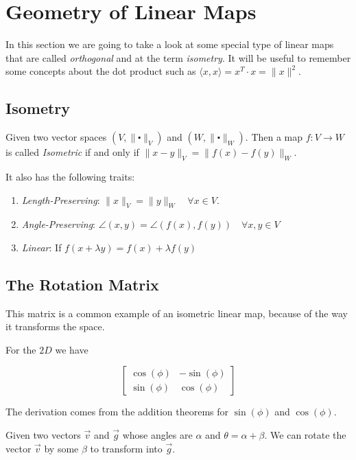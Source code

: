 \newpage
\section{Geometry of Linear Maps}

In this section we are going to take a look at some special type of linear maps that are called \emph{orthogonal} 
and at the term \emph{isometry}. It will be useful to remember some concepts about the dot product such as 
\(\langle x, x \rangle = x^T \cdot x = \|x\|^2\).

\subsection{Isometry}

Given two vector spaces \((V, \|\centerdot\|_V)\) and \((W, \|\centerdot\|_W)\). Then a map 
\(f: V \to W\) is called \emph{Isometric} if and only if \(\|x - y\|_V = \|f(x) - f(y)\|_W \).

It also has the following traits:

\begin{enumerate}
	\item \emph{Length-Preserving}: \(\|x\|_V = \|y\|_W \quad \forall x \in V\).
	\item \emph{Angle-Preserving}: \(\angle (x,y) = \angle (f(x),f(y)) \quad \forall x,y \in V\)
	\item \emph{Linear}: If \(f(x + \lambda y) = f(x) + \lambda f(y)\)
\end{enumerate}

\subsection{The Rotation Matrix}

This matrix is a common example of an isometric linear map, because of the way it transforms the space.

For the \(2D\) we have 

\[
    \begin{bmatrix}
        \cos(\phi) & -\sin(\phi)\\
        \sin(\phi) & \cos(\phi)
    \end{bmatrix}
\]

The derivation comes from the addition theorems for \(\sin(\phi) \) and \(\cos(\phi)\).

Given two vectors \(\vec{v}\) and \(\vec{g}\) whose angles are \(\alpha\) and \(\theta = \alpha + \beta\). 
We can rotate the vector \(\vec{v}\) by some \(\beta\) to transform into \(\vec{g}\).

